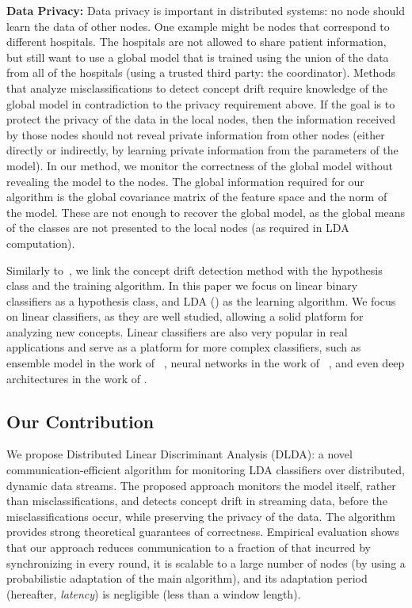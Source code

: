 \noindent \textbf{Data Privacy:} Data privacy is important in distributed systems: no node should learn the data of other nodes.
    One example might be nodes that correspond to different hospitals. The hospitals are not allowed to share patient information, but still want to use a global model that is trained using the union of the data from all of the hospitals (using a trusted third party: the coordinator).
    Methods that analyze misclassifications to detect concept drift require knowledge of the global model in contradiction to the privacy requirement above. If the goal is to protect the privacy of the data in the local nodes, then the information received by those nodes should not reveal private information from other nodes (either directly or indirectly, by learning private information from the parameters of the model).
    In our method, we monitor the correctness of the global model without revealing the model to the nodes. The global information required for our algorithm is the global covariance matrix of the feature space and the norm of the model. These are not enough to recover the global model, as the global means of the classes are not presented to the local nodes (as required in LDA computation).



Similarly to~\cite{icml2014c2_harel14}, we link the concept drift detection method with the
hypothesis class and the training algorithm.
In this paper we focus on linear binary classifiers as a hypothesis class, and
LDA (\citealt{fisher1936use}) as the learning algorithm.
We focus on linear classifiers, as they are well studied, allowing a solid platform for analyzing new concepts. Linear classifiers are also very popular in real applications and serve as a platform for more complex classifiers, such as ensemble model in the work of ~\cite{Deva, eSVM},
neural networks in the work of ~\cite{osadchy2015k}, and even deep architectures in the work of \cite{ROSS}.


\subsection{Our Contribution}
We propose Distributed Linear Discriminant Analysis (DLDA): a novel communication-efficient algorithm for monitoring LDA classifiers over distributed, dynamic data streams.
The proposed approach monitors the model itself, rather than misclassifications,
and detects concept drift in streaming data, before the misclassifications occur, while  preserving the privacy of the data.
The algorithm provides strong theoretical guarantees of correctness.
Empirical evaluation shows that our approach reduces communication to a fraction of that incurred by synchronizing in every round, it is scalable to a large number of nodes (by using a probabilistic adaptation of the main algorithm), and its adaptation period (hereafter, \textit{latency}) is negligible  (less than a window length).


